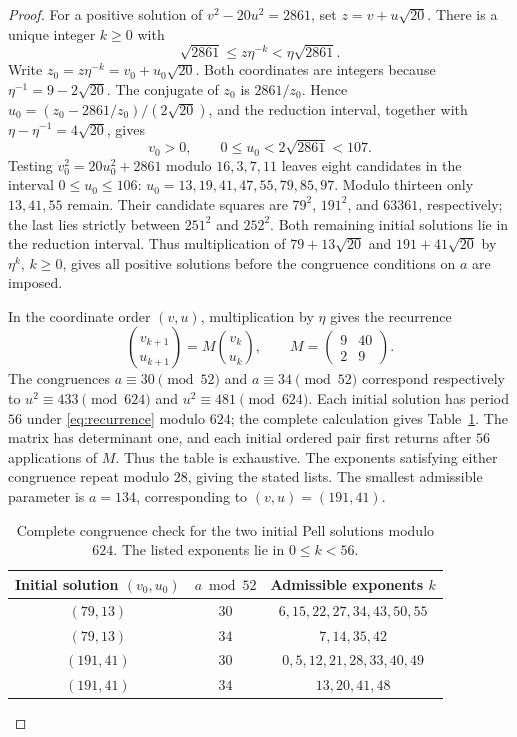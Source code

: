 \documentclass[11pt,leqno,oneside,letterpaper]{amsart}
\theoremstyle{remark}
\numberwithin{equation}{section}
\begin{document}
\begin{proof}
  For a positive solution of $v^2-20u^2=2861$, set $z=v+u\sqrt{20}$. There is a unique integer $k\geq0$ with
  \[
    \sqrt{2861}\leq z\eta^{-k}<\eta\sqrt{2861}.
  \]
  Write $z_0=z\eta^{-k}=v_0+u_0\sqrt{20}$. Both coordinates are integers because $\eta^{-1}=9-2\sqrt{20}$. The conjugate of $z_0$ is $2861/z_0$. Hence $u_0=(z_0-2861/z_0)/(2\sqrt{20})$, and the reduction interval, together with $\eta-\eta^{-1}=4\sqrt{20}$, gives
  \[
    v_0>0,\qquad 0\leq u_0<2\sqrt{2861}<107.
  \]
  Testing $v_0^2=20u_0^2+2861$ modulo $16,3,7,11$ leaves eight candidates in the interval $0\leq u_0\leq106$: $u_0=13,19,41,47,55,79,85,97$. Modulo thirteen only $13,41,55$ remain. Their candidate squares are $79^2$, $191^2$, and $63361$, respectively; the last lies strictly between $251^2$ and $252^2$. Both remaining initial solutions lie in the reduction interval. Thus multiplication of $79+13\sqrt{20}$ and $191+41\sqrt{20}$ by $\eta^k$, $k\geq0$, gives all positive solutions before the congruence conditions on $a$ are imposed.

  In the coordinate order $(v,u)$, multiplication by $\eta$ gives the recurrence
  \begin{equation}\label{eq:recurrence}
    \binom{v_{k+1}}{u_{k+1}}=
    M\binom{v_k}{u_k},\qquad
    M=\begin{pmatrix}9&40\\2&9\end{pmatrix}.
  \end{equation}
  The congruences $a\equiv30\pmod{52}$ and $a\equiv34\pmod{52}$ correspond respectively to $u^2\equiv433\pmod{624}$ and $u^2\equiv481\pmod{624}$. Each initial solution has period $56$ under \eqref{eq:recurrence} modulo $624$; the complete calculation gives Table~\ref{tab:pell}. The matrix has determinant one, and each initial ordered pair first returns after $56$ applications of $M$. Thus the table is exhaustive. The exponents satisfying either congruence repeat modulo $28$, giving the stated lists. The smallest admissible parameter is $a=134$, corresponding to $(v,u)=(191,41)$.

  \begin{table}[ht]
    \centering

    \begin{tabular}{ccc}
      \toprule
      Initial solution $(v_0,u_0)$ & $a\bmod52$ & Admissible exponents $k$ \\
      \midrule
      $(79,13)$                    & $30$       & $6,15,22,27,34,43,50,55$ \\
      $(79,13)$                    & $34$       & $7,14,35,42$             \\
      $(191,41)$                   & $30$       & $0,5,12,21,28,33,40,49$  \\
      $(191,41)$                   & $34$       & $13,20,41,48$            \\
      \bottomrule
    \end{tabular}
    \caption{Complete congruence check for the two initial Pell solutions modulo $624$. The listed exponents lie in $0\leq k<56$.}
    \label{tab:pell}
  \end{table}


\end{proof}
\end{document}
